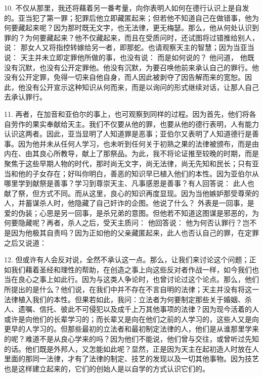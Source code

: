 10. 不仅从那里，我还将藉着另一番考量，向你表明人如何在德行认识上是自发的。亚当犯了第一罪；犯罪后他立即藏匿起来；但若他不知道自己在做错事，他为何要藏起来呢？因为那时既无文字，也无法律，更无梅瑟。那么，他从何处认识到罪的？为何要藏起来？他不仅藏起来，而且在受质问时，还试图将过错推给别人，说： 那女人又将指控转嫁给另一者，即那蛇。也请观察天主的智慧；因为当亚当说： 天主并未立即定罪他所做的事，也没有说： 而是如何说的？ 他问道， 他既没有沉默，也没有公开定罪他。他没有沉默，为要召唤他前来承认自己的罪行。他没有公开定罪，免得一切来自他自身，而人因此被剥夺了因告解而来的宽恕。因此，他没有公开宣示这种知识从何而来，而是以询问的形式继续对话，让那人自己去承认罪行。\par

11. 再者，在加音和亚伯尔的事上，也可观察到同样的过程。因为首先，他们将各自劳作的果实奉献给天主。我们不仅要从他的罪，也要从他的德行表明，人有能力认识这两者。因此，亚当显明了人知道罪是恶事；亚伯尔又表明了人知道德行是善事。因为他并未从任何人学习，也未听到任何关于初熟之果的法律被颁布，而是由内在、由其良心所教导，献上了那祭品。为此，我不将论证推至较晚的时期，而是聚焦于这些早期人物的时代，那时尚无文字，尚无法律，尚无先知和民长；只有亚当和他的子女存在；好叫你明白，善恶的知识早已植入他们的本性。因为亚伯尔从哪里学到献祭是善事？学习到尊崇天主、凡事感恩是善事？有人回答说： 此人也献了祭，但方式不同。而从这里，良心的知识再度显现。因为当他嫉妒那受尊荣的人，并蓄谋杀人时，他隐藏了自己奸诈的企图。他说了什么？ 外表是一回事，是爱的伪装；心思是另一回事，是杀兄弟的意图。但他若不知道这图谋是邪恶的，为何要隐藏呢？再者，杀人之后，受天主质问： 他回答说： 他为何否认罪行？岂不是因为他极其自责吗？因为正如他的父亲藏匿起来，此人也否认自己的罪，在定罪之后又说道：\par

12. 但或许有人会反对说，全然不承认这一点。那么，让我们来讨论这个问题；正如我们藉着圣经和理性的帮助，在创造之事上向这些反对者作战一样，如今我们也当在良心之事上如此行。因为与这类人争论时，也曾讨论过这个论点。那么，他们所提出的是什么？他们说，在我们中并不存在不言自明的法律；天主并没有将这一法律植入我们的本性。但果若如此，我问：立法者为何要制定那些关于婚姻、杀人、遗嘱、信托、彼此不可侵犯以及成千上万其他事项的法律？因为现今活着的人或许是向他们的长辈学习的；而长辈又是向在他们之前的人学习的，这些人又是向更早的人学习的。但那些最初的立法者和最初制定法律的人，他们是从谁那里学来的呢？难道不是从良心学来的吗？因为他们不能说，他们曾与交往，或曾听过先知的话。他们既是外邦人，又怎能如此呢？显然，正是因为天主在起初造人时放在人里面的那同一法律，才有了法律的制定、技艺的发现以及一切其他事物。因为技艺也是这样建立起来的，它们的创始人是以自学的方式认识它们的。\par

